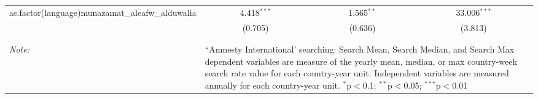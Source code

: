 \begin{table}[!htbp]
\begin{tabular}{@{\extracolsep{5pt}}lccc}
  as.factor(language)munazamat\_aleafw\_alduwalia & 4.418$^{***}$ & 1.565$^{**}$ & 33.006$^{***}$ \\ 
  & (0.705) & (0.636) & (3.813) \\ 
 \hline \\[-1.8ex] 
\hline 
\hline \\[-1.8ex] 
\textit{Note:}  & \multicolumn{3}{l}{\parbox[t]{8cm}{``Amnesty International' searching: Search Mean, Search Median, and Search Max dependent variables are measure of the yearly mean, median, or max country-week search rate value for each country-year unit. Independent variables are measured annually for each country-year unit. $^{*}$p$<$0.1; $^{**}$p$<$0.05; $^{***}$p$<$0.01}} \\ 
\end{tabular} 
\end{table} 
